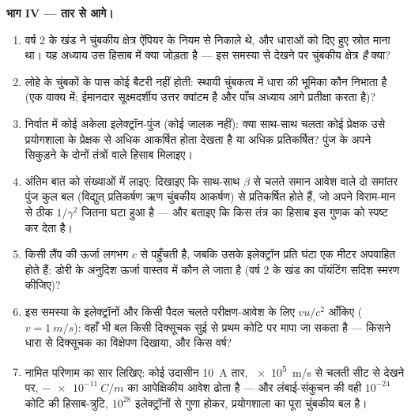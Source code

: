 \begin{problem}[{सप्ताहांत समस्या --- $10^{-24}$ का असंतुलन हर मोटर
कैसे चलाता है}]
\medskip\noindent\textbf{भाग IV --- तार से आगे।}
\begin{enumerate}[resume]
  \item वर्ष 2 के खंड ने चुंबकीय क्षेत्र ऐंपियर के नियम से निकाले
        थे, और धाराओं को दिए हुए स्रोत माना था। यह अध्याय उस
        हिसाब में क्या जोड़ता है --- इस समस्या से देखने पर चुंबकीय
        क्षेत्र \emph{है} क्या?
  \item लोहे के चुंबकों के पास कोई बैटरी नहीं होती: स्थायी चुंबकत्व
        में धारा की भूमिका कौन निभाता है (एक वाक्य में; ईमानदार
        सूक्ष्मदर्शीय उत्तर क्वांटम है और पाँच अध्याय आगे प्रतीक्षा
        करता है)?
  \item निर्वात में कोई अकेला इलेक्ट्रॉन-पुंज (कोई जालक नहीं): क्या
        साथ-साथ चलता कोई प्रेक्षक उसे प्रयोगशाला के प्रेक्षक से अधिक
        आकर्षित होता देखता है या अधिक प्रतिकर्षित? पुंज के अपने
        सिकुड़ने के दोनों तंत्रों वाले हिसाब मिलाइए।
  \item अंतिम बात को संख्याओं में लाइए: दिखाइए कि साथ-साथ $\beta$ से
        चलते समान आवेश वाले दो समांतर पुंज कुल बल (विद्युत् प्रतिकर्षण
        ऋण चुंबकीय आकर्षण) से प्रतिकर्षित होते हैं, जो अपने
        विराम-मान से ठीक $1/\gamma^2$ जितना घटा हुआ है --- और
        बताइए कि किस तंत्र का हिसाब इस गुणक को स्पष्ट कर देता है।
  \item किसी लैंप की ऊर्जा लगभग $c$ से पहुँचती है, जबकि उसके
        इलेक्ट्रॉन प्रति घंटा एक मीटर अपवाहित होते हैं: डोरी के
        अनुदिश ऊर्जा वास्तव में कौन ले जाता है (वर्ष 2 के खंड का
        पॉयंटिंग सदिश स्मरण कीजिए)?
  \item इस समस्या के इलेक्ट्रॉनों और किसी पैदल चलते परीक्षण-आवेश के
        लिए $vu/c^2$ आँकिए ($v = \qty{1}{m/s}$): वहाँ भी
        बल किसी दिक्सूचक सुई से प्रथम कोटि पर मापा जा सकता है ---
        किसने धारा से दिक्सूचक का विक्षेपण दिखाया, और किस वर्ष?
  \item नामित परिणाम का सार लिखिए: कोई उदासीन \qty{10}{A} तार,
        \qty{e5}{m/s} से चलती सीट से देखने पर,
        $-\qty{e-11}{C/m}$ का आपेक्षिकीय आवेश ढोता है --- और
        लंबाई-संकुचन की वही $10^{-24}$ कोटि की हिसाब-त्रुटि,
        $10^{28}$ इलेक्ट्रॉनों से गुणा होकर, प्रयोगशाला का पूरा
        चुंबकीय बल है।
\end{enumerate}
\end{problem}
